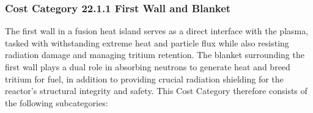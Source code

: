 
\subsubsection*{Cost Category 22.1.1 First Wall and Blanket}

The first wall in a fusion heat island serves as a direct interface with the plasma, tasked with withstanding extreme heat and particle flux while also resisting radiation damage and managing tritium retention. The blanket surrounding the first wall plays a dual role in absorbing neutrons to generate heat and breed tritium for fuel, in addition to providing crucial radiation shielding for the reactor's structural integrity and safety.  This Cost Category therefore consists of the following subcategories:


